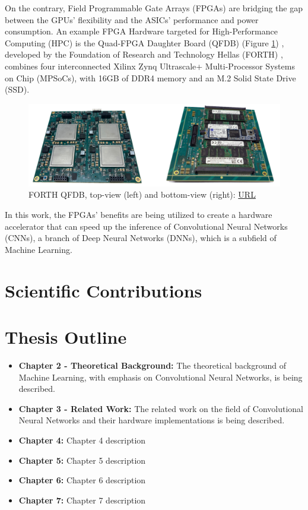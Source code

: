 On the contrary, Field Programmable Gate Arrays (FPGAs) are bridging the gap between the GPUs' flexibility and the ASICs' performance and power consumption. An example FPGA Hardware targeted for High-Performance Computing (HPC) is the Quad-FPGA Daughter Board (QFDB) (Figure \ref{fig:forth-qfdb-daughterboard}) \cite{Implementation-and-Impact-of-an-Ultra-Compact-Multi-FPGA-Board-for-Large-System-Prototyping}, developed by the Foundation of Research and Technology Hellas (FORTH) \cite{FORTH}, combines four interconnected Xilinx Zynq Ultrascale+ Multi-Processor Systems on Chip (MPSoCs), with 16GB of DDR4 memory and an M.2 Solid State Drive (SSD).

\begin{figure} [H]
	\centering
	\includegraphics[scale=0.22]{Images/Hardware/QFDB.png}
	\decoRule
	\caption[FORTH QFDB]{FORTH QFDB, top-view (left) and bottom-view (right): \href{https://ieeexplore.ieee.org/stamp/stamp.jsp?arnumber=8945720}{URL}}
	\label{fig:forth-qfdb-daughterboard}
\end{figure}

In this work, the FPGAs' benefits are being utilized to create a hardware accelerator that can speed up the inference of Convolutional Neural Networks (CNNs), a branch of Deep Neural Networks (DNNs), which is a subfield of Machine Learning.

\section{Scientific Contributions}

\section{Thesis Outline}
\begin{itemize}
	\item \textbf{Chapter 2 - Theoretical Background:} The theoretical background of Machine Learning, with emphasis on Convolutional Neural Networks, is being described.
	\item \textbf{Chapter 3 - Related Work:} The related work on the field of Convolutional Neural Networks and their hardware implementations is being described.
	\item \textbf{Chapter 4:} Chapter 4 description
	\item \textbf{Chapter 5:} Chapter 5 description
	\item \textbf{Chapter 6:} Chapter 6 description
	\item \textbf{Chapter 7:} Chapter 7 description
\end{itemize}
